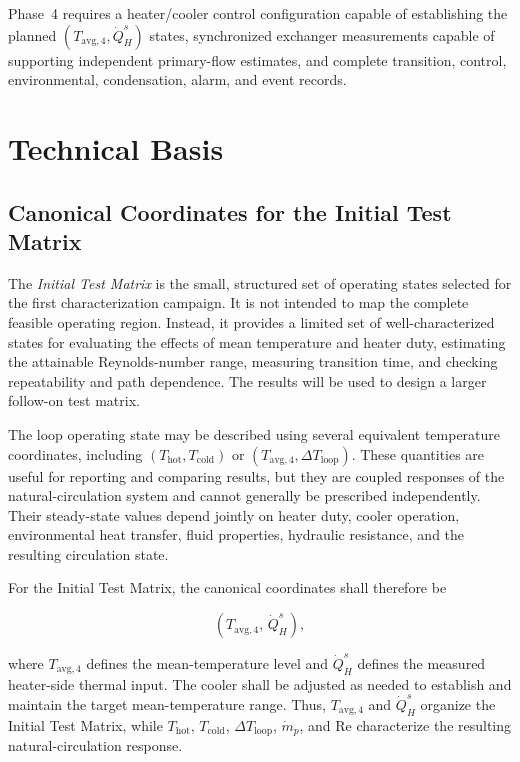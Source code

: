 \documentclass[11pt]{article}
\newcommand{\Tavg}{T_{\mathrm{avg},4}}
\newcommand{\Thot}{T_{\mathrm{hot}}}
\newcommand{\Tcold}{T_{\mathrm{cold}}}
\newcommand{\QHs}{\dot Q_{H}^{s}}
\newcommand{\mdotp}{\dot m_{p}}
\newcommand{\Rey}{\mathrm{Re}}
\begin{document}
Phase~4 requires a heater/cooler control configuration capable of establishing the planned $(\Tavg,\QHs)$ states, synchronized exchanger measurements capable of supporting independent primary-flow estimates, and complete transition, control, environmental, condensation, alarm, and event records.

\clearpage
\section{Technical Basis}
\label{sec:technical_basis}
\subsection{Canonical Coordinates for the Initial Test Matrix}

The \emph{Initial Test Matrix} is the small, structured set of operating states selected for the first characterization campaign. It is not intended to map the complete feasible operating region. Instead, it provides a limited set of well-characterized states for evaluating the effects of mean temperature and heater duty, estimating the attainable Reynolds-number range, measuring transition time, and checking repeatability and path dependence. The results will be used to design a larger follow-on test matrix.

The loop operating state may be described using several equivalent temperature coordinates, including $(\Thot,\Tcold)$ or $(\Tavg,\Delta T_{\mathrm{loop}})$. These quantities are useful for reporting and comparing results, but they are coupled responses of the natural-circulation system and cannot generally be prescribed independently. Their steady-state values depend jointly on heater duty, cooler operation, environmental heat transfer, fluid properties, hydraulic resistance, and the resulting circulation state.

For the Initial Test Matrix, the canonical coordinates shall therefore be

\begin{equation}
    \left(\Tavg,\,\QHs\right),
\end{equation}

where $\Tavg$ defines the mean-temperature level and $\QHs$ defines the measured heater-side thermal input. The cooler shall be adjusted as needed to establish and maintain the target mean-temperature range. Thus, $\Tavg$ and $\QHs$ organize the Initial Test Matrix, while $\Thot$, $\Tcold$, $\Delta T_{\mathrm{loop}}$, $\mdotp$, and $\Rey$ characterize the resulting natural-circulation response.
\end{document}
